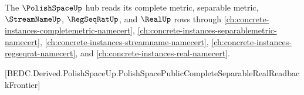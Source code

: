The $\PolishSpaceUp$ hub reads its complete metric, separable metric, $\StreamNameUp$, $\RegSeqRatUp$, and $\RealUp$ rows through \autoref{ch:concrete-instances-completemetric-namecert}, \autoref{ch:concrete-instances-separablemetric-namecert}, \autoref{ch:concrete-instances-streamname-namecert}, \autoref{ch:concrete-instances-regseqrat-namecert}, and \autoref{ch:concrete-instances-real-namecert}.

[BEDC.Derived.PolishSpaceUp.PolishSpacePublicCompleteSeparableRealReadbackFrontier]









